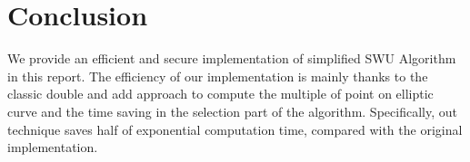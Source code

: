 \section{Conclusion}
We provide an efficient and secure implementation of simplified SWU Algorithm in 
this report.  The efficiency of our implementation is mainly thanks to the classic
double and add approach to compute the multiple of point on elliptic curve
and the time saving in the selection part of the algorithm. Specifically,
out technique saves half of exponential computation time,
compared with the original implementation.
